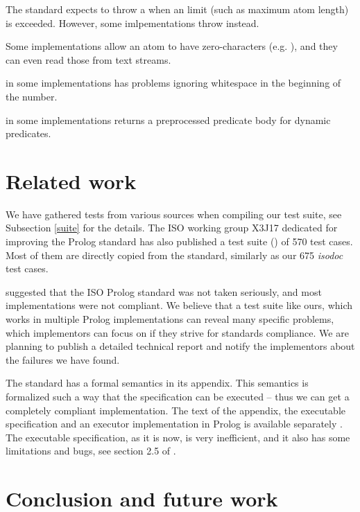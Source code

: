 \documentclass[draft]{llncs}%
\begin{document}
The standard expects  to throw a
 when an
limit (such as maximum atom length) is exceeded.
However, some imlpementations throw
 instead.

Some implementations allow an atom to have zero-characters
(e.g. ), and they can even read those from text
streams.

 in some implementations has problems
ignoring whitespace in the beginning of the number.

 in some implementations returns a preprocessed predicate
body for dynamic predicates.


\section{Related work}

We have gathered tests from various sources when compiling our test suite,
see Subsection \ref{suite} for the details.
The ISO working group X3J17 dedicated for improving the Prolog standard has
also published a test suite (\cite{validation}) of 570 test cases. Most of
them are directly copied from the standard, similarly as our 675
\emph{iso\textunderscore doc} test cases.

\cite{seriously} suggested that the ISO Prolog standard was not taken
seriously, and most implementations were not compliant. We believe that a
test suite like ours, which works in multiple Prolog implementations can
reveal many specific problems, which implementors can focus on if
they strive for standards compliance. We are planning to publish a detailed
technical report and notify the implementors about the failures we have
found.

The standard has a formal semantics in its appendix. This semantics is
formalized such a way that the specification can be executed -- thus we can
get a completely compliant implementation. The text of the appendix, the
executable specification and an executor implementation in Prolog is
available separately \cite{executable}. The executable specification, as
it is now, is very inefficient, and it also has some limitations and bugs,
see section 2.5 of \cite{executable}.


\section{Conclusion and future work}
\end{document}
